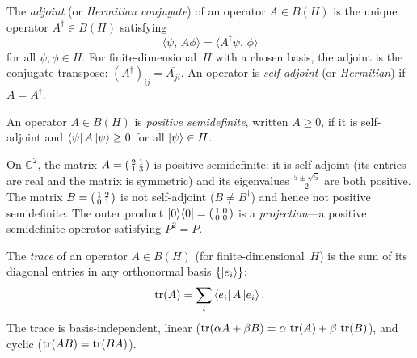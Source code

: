 \begin{definition}[Adjoint]
\label{def:adjoint}
The \emph{adjoint} (or \emph{Hermitian conjugate}) of an operator
$A \in B(H)$ is the unique operator $A^\dagger \in B(H)$ satisfying
\[
  \langle \psi,\, A\phi \rangle
  = \langle A^\dagger\psi,\, \phi \rangle
\]
for all $\psi, \phi \in H$.
For finite-dimensional~$H$ with a chosen basis, the adjoint is the
conjugate transpose:
$(A^\dagger)_{ij} = \overline{A_{ji}}$.
An operator is \emph{self-adjoint} (or \emph{Hermitian}) if
$A = A^\dagger$.
\end{definition}

\begin{definition}
\label{def:positive-semidefinite}
An operator $A \in B(H)$ is \emph{positive semidefinite}, written
$A \geq 0$, if it is self-adjoint and
$\bra{\psi} A \ket{\psi} \geq 0$ for all $\ket{\psi} \in H$.
\end{definition}

\begin{example}
\label{ex:2x2-operators}
On $\mathbb{C}^2$, the matrix
$A = \begin{psmallmatrix} 2 & 1 \\ 1 & 3 \end{psmallmatrix}$
is positive semidefinite: it is self-adjoint (its entries are real and
the matrix is symmetric) and its eigenvalues
$\frac{5 \pm \sqrt{5}}{2}$ are both positive.
The matrix
$B = \begin{psmallmatrix} 1 & 2 \\ 0 & 1 \end{psmallmatrix}$
is not self-adjoint ($B \neq B^\dagger$) and hence not positive
semidefinite.
The outer product
$\ket{0}\!\bra{0} =
\begin{psmallmatrix} 1 & 0 \\ 0 & 0 \end{psmallmatrix}$
is a \emph{projection}---a positive semidefinite operator satisfying
$P^2 = P$.
\end{example}

\begin{definition}[Trace]
\label{def:trace}
The \emph{trace} of an operator $A \in B(H)$
(for finite-dimensional~$H$) is the sum of its diagonal entries in
any orthonormal basis $\{\ket{e_i}\}$:
\[
  \operatorname{tr}(A) = \sum_i \bra{e_i} A \ket{e_i}.
\]
The trace is basis-independent, linear
($\operatorname{tr}(\alpha A + \beta B) =
\alpha\,\operatorname{tr}(A) + \beta\,\operatorname{tr}(B)$), and cyclic
($\operatorname{tr}(AB) = \operatorname{tr}(BA)$).
\end{definition}

